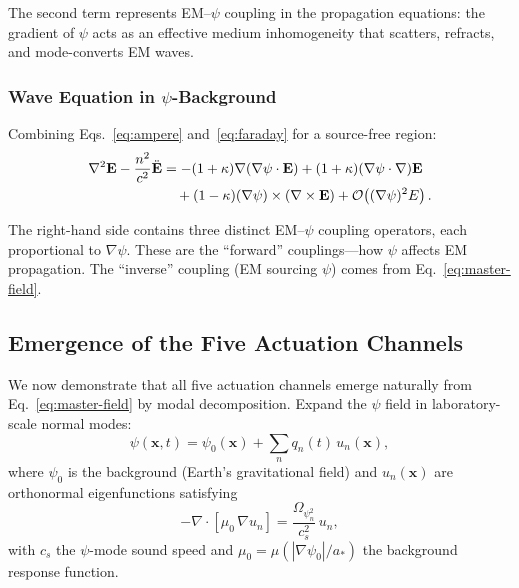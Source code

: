 \documentclass[aps,prd,twocolumn,superscriptaddress,floatfix,nofootinbib]{revtex4-2}
\newcommand{\astar}{a_*}
\newcommand{\mufunction}{\mu}
\newcommand{\Opsi}{\Omega_\psi}
\newcommand{\kap}{\kappa}
\newcommand{\order}[1]{\mathcal{O}\!\left(#1\right)}
\begin{document}
The second term represents EM--$\psi$ coupling in the propagation
equations: the gradient of $\psi$ acts as an effective medium
inhomogeneity that scatters, refracts, and mode-converts EM waves.

\subsubsection{Wave Equation in $\psi$-Background}

Combining Eqs.~\eqref{eq:ampere} and~\eqref{eq:faraday} for a
source-free region:
\begin{align}
\nabla^2\mathbf{E} - \frac{n^2}{c^2}\ddot{\mathbf{E}} &=
-(1+\kap)\nabla(\nabla\psi\cdot\mathbf{E})
+ (1+\kap)(\nabla\psi\cdot\nabla)\mathbf{E} \notag\\
&\quad + (1-\kap)(\nabla\psi)\times(\nabla\times\mathbf{E})
+ \order{(\nabla\psi)^2 E}.
\label{eq:wave-psi}
\end{align}

The right-hand side contains three distinct EM--$\psi$ coupling
operators, each proportional to $\nabla\psi$. These are the ``forward''
couplings---how $\psi$ affects EM propagation. The ``inverse'' coupling
(EM sourcing $\psi$) comes from Eq.~\eqref{eq:master-field}.

\subsection{Emergence of the Five Actuation Channels}\label{sec:channels}

We now demonstrate that all five actuation channels emerge naturally
from Eq.~\eqref{eq:master-field} by modal decomposition. Expand the
$\psi$ field in laboratory-scale normal modes:
\begin{equation}
\psi(\mathbf{x},t) = \psi_0(\mathbf{x}) + \sum_n q_n(t)\,u_n(\mathbf{x}),
\label{eq:modal-expansion}
\end{equation}
where $\psi_0$ is the background (Earth's gravitational field) and
$u_n(\mathbf{x})$ are orthonormal eigenfunctions satisfying
\begin{equation}
-\nabla\cdot[\mufunction_0\,\nabla u_n]
= \frac{\Opsi_n^2}{c_s^2}\,u_n,
\label{eq:eigenvalue}
\end{equation}
with $c_s$ the $\psi$-mode sound speed and $\mufunction_0 = \mufunction(|\nabla\psi_0|/\astar)$ the background response function.
\end{document}
